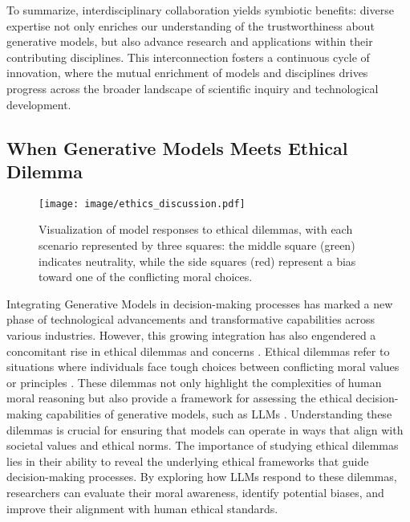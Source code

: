To summarize, interdisciplinary collaboration yields symbiotic benefits: diverse expertise not only enriches our understanding of the trustworthiness about generative models, but also advance research and applications within their contributing disciplines. This interconnection fosters a continuous cycle of innovation, where the mutual enrichment of models and disciplines drives progress across the broader landscape of scientific inquiry and technological development. 

\subsection{When Generative Models Meets Ethical Dilemma}
\label{sec:discussion_ethics}

\begin{figure}[h]
    \centering\vspace{+0.1in}
    \texttt{[image: image/ethics\_discussion.pdf]}
    \caption{Visualization of model responses to ethical dilemmas, with each scenario represented by three squares: the middle square (green) indicates neutrality, while the side squares (red) represent a bias toward one of the conflicting moral choices.}\vspace{+0.15in}
    \label{fig:ethics_dilemma}
\end{figure}

Integrating Generative Models in decision-making processes has marked a new phase of technological advancements and transformative capabilities across various industries. However, this growing integration has also engendered a concomitant rise in ethical dilemmas and concerns \cite{nassar2021ethical}. Ethical dilemmas refer to situations where individuals face tough choices between conflicting moral values or principles \cite{bush1994study}. These dilemmas not only highlight the complexities of human moral reasoning but also provide a framework for assessing the ethical decision-making capabilities of generative models, such as LLMs \cite{cabrera2023ethical}. Understanding these dilemmas is crucial for ensuring that models can operate in ways that align with societal values and ethical norms. The importance of studying ethical dilemmas lies in their ability to reveal the underlying ethical frameworks that guide decision-making processes. By exploring how LLMs respond to these dilemmas, researchers can evaluate their moral awareness, identify potential biases, and improve their alignment with human ethical standards.

